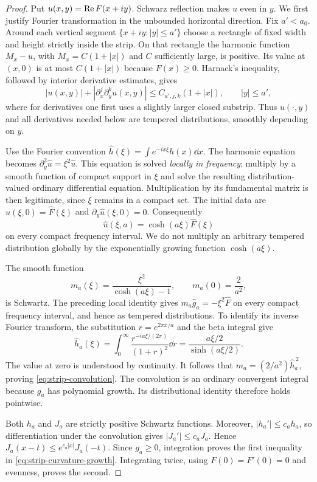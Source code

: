 \begin{proof}
Put $u(x,y)=\operatorname{Re} F(x+iy)$.  Schwarz reflection makes $u$ even in $y$.
We first justify Fourier transformation in the unbounded horizontal
direction.  Fix $a'<a_0$.  Around each vertical segment
$\{x+iy:|y|\le a'\}$ choose a rectangle of fixed width and height
strictly inside the strip.  On that rectangle the harmonic function
$M_x-u$, with $M_x=C(1+|x|)$ and $C$ sufficiently large, is positive.
Its value at $(x,0)$ is at most $C(1+|x|)$ because $F(x)\ge0$.
Harnack's inequality, followed by interior derivative estimates, gives
\[
 |u(x,y)|+|\partial_x^j\partial_y^k u(x,y)|
      \le C_{a',j,k}(1+|x|),\qquad |y|\le a',
\]
where for derivatives one first uses a slightly larger closed substrip.
Thus $u(\cdot,y)$ and all derivatives needed below are tempered
distributions, smoothly depending on $y$.

Use the Fourier convention $\widehat h(\xi)=\int e^{-ix\xi}h(x)\dd x$.
The harmonic equation becomes
$\partial_y^2\widehat u=\xi^2\widehat u$.  This equation is solved
\emph{locally in frequency}: multiply by a smooth function of compact
support in $\xi$ and solve the resulting distribution-valued ordinary
differential equation.  Multiplication by its fundamental matrix is
then legitimate, since $\xi$ remains in a compact set.  The initial
data are $\widehat u(\xi,0)=\widehat F(\xi)$ and
$\partial_y\widehat u(\xi,0)=0$.  Consequently
\[
 \widehat u(\xi,a)=\cosh(a\xi)\widehat F(\xi)
\]
on every compact frequency interval.  We do not multiply an arbitrary
tempered distribution globally by the exponentially growing function
$\cosh(a\xi)$.

The smooth function
\[
 m_a(\xi)=\frac{\xi^2}{\cosh(a\xi)-1},
 \qquad m_a(0)=\frac{2}{a^2},
\]
is Schwartz.  The preceding local identity gives
$m_a\widehat g_a=-\xi^2\widehat F$ on every compact frequency interval,
and hence as tempered distributions.  To identify its inverse Fourier
transform, the substitution $r=e^{2\pi x/a}$ and the beta integral give
\[
 \widehat h_a(\xi)
 =\int_0^\infty\frac{r^{-ia\xi/(2\pi)}}{(1+r)^2}\dd r
 =\frac{a\xi/2}{\sinh(a\xi/2)}.
\]
The value at zero is understood by continuity.  It follows that
$m_a=(2/a^2)\widehat h_a^{\,2}$, proving
\eqref{eq:strip-convolution}.  The convolution is an ordinary convergent
integral because $g_a$ has polynomial growth.  Its distributional
identity therefore holds pointwise.

Both $h_a$ and $J_a$ are strictly positive Schwartz functions.  Moreover,
$|h_a'|\le c_a h_a$, so differentiation under the convolution gives
$|J_a'|\le c_a J_a$.  Hence
$J_a(x-t)\le e^{c_a|x|}J_a(-t)$.  Since $g_a\ge0$, integration proves
the first inequality in \eqref{eq:strip-curvature-growth}.  Integrating
twice, using $F(0)=F'(0)=0$ and evenness, proves the second.
\end{proof}

